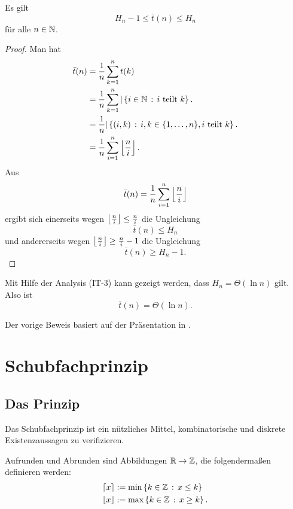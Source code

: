 \begin{thm}
	Es gilt
	\[
		 H_n - 1 \le \bar{t}(n) \le H_n 
	\]
	für alle $n \in \mathbb{N}$. 
\end{thm} 
\begin{proof}
	Man hat 
	\begin{align*} 
		\bar{t} (n) & = \frac{1}{n} \sum_{k=1}^n t(k) 
		\\ & = \frac{1}{n} \sum_{k=1}^n | \setcond{i \in \N}{i \ \text{teilt} \ k}. 
		\\ & = \frac{1}{n} | \setcond{(i,k)}{i,k \in \{1,\ldots,n\}, i \ \text{teilt}  \ k}. 
		\\ & = \frac{1}{n} \sum_{i=1}^n \floor{ \frac{n}{i}}. 
	\end{align*}  
	Aus 
	\[
			\bar{t} (n) = \frac{1}{n} \sum_{i=1}^n \left\lfloor  \frac{n}{i} \right\rfloor
	\]
	ergibt sich einerseits wegen $\left\lfloor  \frac{n}{i} \right\rfloor \le \frac{n}{i}$ die Ungleichung 
	\[
			\bar{t}(n) \le H_n
	\]
	und andererseits wegen $\left\lfloor  \frac{n}{i}  \right\rfloor \ge \frac{n}{i} - 1$ die Ungleichung 
	\[
			\bar{t}(n) \ge H_n -1. 
	\]
\end{proof} 

\begin{bem}
	Mit Hilfe der Analysis (IT-3) kann gezeigt werden, dass $H_n= \Theta(\ln n)$ gilt. Also ist 
	\[
		\bar{t}(n) = \Theta(\ln n). 
	\]
\end{bem} 

\begin{bem}
	Der vorige Beweis basiert auf der Präsentation in \cite[Kap.~25, Abs.~4]{AZ02}. 
\end{bem} 

\section{Schubfachprinzip} 

\subsection{Das Prinzip} 

\begin{bem}
	Das Schubfachprinzip ist ein nützliches Mittel, kombinatorische und diskrete  Existenzaussagen zu verifizieren. 
\end{bem} 

\begin{defn}
	Aufrunden und Abrunden sind Abbildungen $\mathbb{R} \to \mathbb{Z}$, die folgendermaßen definieren werden: 
	\begin{align*}
			\left\lceil x \right\rceil & := \min \left\{ k \in \mathbb{Z} \,:\, x \le k \right\}
			\\ \left\lfloor x \right\rfloor & := \max \left\{ k \in \mathbb{Z} \,:\, x \ge k \right\}. 
	\end{align*} 
\end{defn} 


